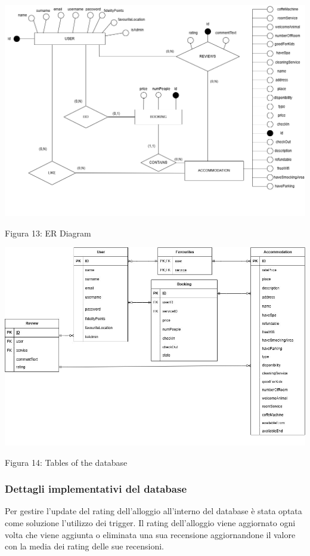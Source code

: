 \documentclass[10pt]{article}
\begin{document}
\begin{center}
\par\medskip
\hspace*{-2cm}
\includegraphics[scale=0.41]{ERimages/FinalER}
\par\medskip
Figura 13: ER Diagram
\par\medskip
\includegraphics[scale=0.5]{ERimages/schemaLogicoDBTabelle}
\par\medskip
Figura 14: Tables of the database
\par\medskip
\end{center}

\subsubsection{Dettagli implementativi del database}

Per gestire l'update del rating dell'alloggio all'interno del database è stata optata come soluzione l'utilizzo dei trigger. Il rating dell'alloggio viene aggiornato ogni volta che viene aggiunta o eliminata una sua recensione aggiornandone il valore con la media dei rating delle sue recensioni.
\end{document}
